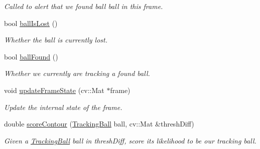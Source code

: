 \begin{DoxyCompactItemize}
\begin{DoxyCompactList}\small\item\em Called to alert that we found ball ball in this frame. \end{DoxyCompactList}\item 
bool \hyperlink{classKFBallTracker_abd8292fdec76b8c8e2c28ce9bc538380}{ball\+Is\+Lost} ()\hypertarget{classKFBallTracker_abd8292fdec76b8c8e2c28ce9bc538380}{}\label{classKFBallTracker_abd8292fdec76b8c8e2c28ce9bc538380}

\begin{DoxyCompactList}\small\item\em Whether the ball is currently lost. \end{DoxyCompactList}\item 
bool \hyperlink{classKFBallTracker_a75a5a6cb4b91ff148796996faa6df1d7}{ball\+Found} ()\hypertarget{classKFBallTracker_a75a5a6cb4b91ff148796996faa6df1d7}{}\label{classKFBallTracker_a75a5a6cb4b91ff148796996faa6df1d7}

\begin{DoxyCompactList}\small\item\em Whether we currently are tracking a found ball. \end{DoxyCompactList}\item 
void \hyperlink{classKFBallTracker_a9466248684d97d13370375c2dde2b533}{update\+Frame\+State} (cv\+::\+Mat $\ast$frame)\hypertarget{classKFBallTracker_a9466248684d97d13370375c2dde2b533}{}\label{classKFBallTracker_a9466248684d97d13370375c2dde2b533}

\begin{DoxyCompactList}\small\item\em Update the internal state of the frame. \end{DoxyCompactList}\item 
double \hyperlink{classKFBallTracker_a31d9933e4c52362ffb1c4fb13af97703}{score\+Contour} (\hyperlink{classTrackingBall}{Tracking\+Ball} ball, cv\+::\+Mat \&thresh\+Diff)\hypertarget{classKFBallTracker_a31d9933e4c52362ffb1c4fb13af97703}{}\label{classKFBallTracker_a31d9933e4c52362ffb1c4fb13af97703}

\begin{DoxyCompactList}\small\item\em Given a \hyperlink{classTrackingBall}{Tracking\+Ball} ball in thresh\+Diff, score its likelihood to be our tracking ball. \end{DoxyCompactList}\end{DoxyCompactItemize}
